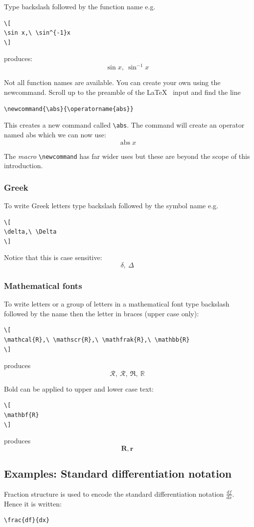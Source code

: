 \documentclass[a4paper,14pt]{extarticle}
\newcommand{\abs}{\operatorname{abs}}
\begin{document}
Type backslash followed by the function name e.g. 
\begin{verbatim}
\[
\sin x,\ \sin^{-1}x
\]
\end{verbatim}
produces:
\[
\sin x,\ \sin^{-1}x
\]

Not all function names are available. You can create your own using the newcommand. Scroll up to the preamble of the \LaTeX~ input and find the line
\begin{verbatim}
\newcommand{\abs}{\operatorname{abs}}
\end{verbatim}
This creates a new command called \verb=\abs=. The command will create an operator named abs which we can now use:
\[
\abs x
\]


The \emph{macro} \verb=\newcommand= has far wider uses but these are beyond the scope of this introduction. 

\subsubsection{Greek}

To write Greek letters type backslash followed by the symbol name e.g. 
\begin{verbatim}
\[
\delta,\ \Delta
\]
\end{verbatim}
Notice that this is case sensitive:
\[
\delta,\ \Delta
\]

\subsubsection{Mathematical fonts}

To write letters or a group of letters in a mathematical font type backslash followed by the name then the letter in braces (upper case only):
\begin{verbatim}
\[
\mathcal{R},\ \mathscr{R},\ \mathfrak{R},\ \mathbb{R} 
\]
\end{verbatim}
produces
\[
\mathcal{R},\ \mathscr{R},\ \mathfrak{R},\ \mathbb{R} 
\]

Bold can be applied to upper and lower case text:
\begin{verbatim}
\[
\mathbf{R}
\] 
\end{verbatim}
produces
\[
\mathbf{R}, \mathbf{r}
\] 

\subsection{Examples: Standard differentiation notation}

Fraction structure is used to encode the standard differentiation notation \(\frac{df}{dx}\). Hence it is written:
\begin{verbatim}
\frac{df}{dx}
\end{verbatim}
\end{document}
